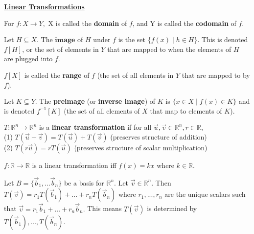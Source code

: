 \documentclass{article}
\begin{document}
\textbf{\underline{Linear Transformations}} 
\begin{definition}
For $f: X \rightarrow Y,$ X is called the \textbf{domain} of $f$, and Y is called the \textbf{codomain} of $f.$
\end{definition}

\begin{definition}
Let $H \subseteq X.$ The $\textbf{image}$ of $H$ under $f$ is the set $\{f(x) \mid h \in H\}.$ This is denoted $f[H]$, or the set of elements in $Y$ that are mapped to when the elements of $H$ are plugged into $f$.
\end{definition}

\begin{definition}
$f[X]$ is called the \textbf{range} of $f$ (the set of all elements in $Y$ that are mapped to by $f$).
\end{definition}

\begin{definition}
Let $K \subseteq Y.$ The \textbf{preimage} (or \textbf{inverse image}) of $K$ is $\{x \in X \mid f(x) \in K\}$ and is denoted $f^{-1}[K]$ (the set of all elements of $X$ that map to elements of $K$).
\end{definition}

\begin{definition}
$T: \mathbb{R}^n \rightarrow \mathbb{R}^n$ is a \textbf{linear transformation} if for all $\vec{u}, \vec{v} \in \mathbb{R}^n , r \in \mathbb{R},$ \\
(1) $T(\vec{u} + \vec{v}) = T(\vec{u}) + T(\vec{v})$ (preserves structure of addition) \\
(2) $T(r\vec{u}) = rT(\vec{u})$ (preserves structure of scalar multiplication)
\end{definition}

\begin{theorem}
$f: \mathbb{R} \rightarrow \mathbb{R} $ is a linear transformation iff $f(x) = kx$ where $k \in \mathbb{R}.$
\end{theorem}

\begin{theorem}
Let $B = \{\vec{b}_{1}, ... \vec{b}_{n}\}$ be a basis for $\mathbb{R}^n.$ Let $\vec{v} \in \mathbb{R}^n.$ Then $T(\vec{v}) = r_1T(\vec{b}_{1}) + ... + r_nT(\vec{b}_{n})$ where $r_1, ... , r_n$ are the unique scalars such that $\vec{v} = r_1\vec{b}_{1} + ... +r_n\vec{b}_{n}.$ This means $T(\vec{v})$ is determined by $T(\vec{b}_{1}), ... , T(\vec{b}_{n}).$

\end{theorem}
\end{document}
